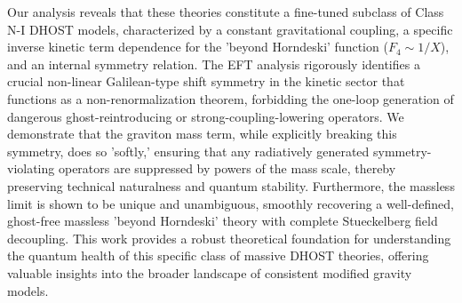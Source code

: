 \documentclass[twocolumn]{aastex631}
\begin{document}
Our analysis reveals that these theories constitute a fine-tuned subclass of Class N-I DHOST models, characterized by a constant gravitational coupling, a specific inverse kinetic term dependence for the 'beyond Horndeski' function ($F_4 \sim 1/X$), and an internal symmetry relation. The EFT analysis rigorously identifies a crucial non-linear Galilean-type shift symmetry in the kinetic sector that functions as a non-renormalization theorem, forbidding the one-loop generation of dangerous ghost-reintroducing or strong-coupling-lowering operators. We demonstrate that the graviton mass term, while explicitly breaking this symmetry, does so 'softly,' ensuring that any radiatively generated symmetry-violating operators are suppressed by powers of the mass scale, thereby preserving technical naturalness and quantum stability. Furthermore, the massless limit is shown to be unique and unambiguous, smoothly recovering a well-defined, ghost-free massless 'beyond Horndeski' theory with complete Stueckelberg field decoupling. This work provides a robust theoretical foundation for understanding the quantum health of this specific class of massive DHOST theories, offering valuable insights into the broader landscape of consistent modified gravity models.
\end{document}
